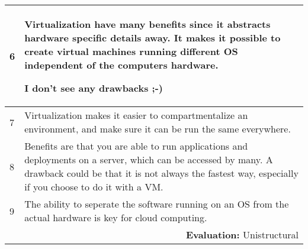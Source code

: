 \begin{longtable}{|p{0.3cm}|p{14.7cm}|}
6 & Virtualization have many benefits since it abstracts hardware specific details away. It makes it possible to create virtual machines running different OS independent of the computers hardware. 

\noindent I don't see any drawbacks ;-) \\ \hline

7 & Virtualization makes it easier to compartmentalize an environment, and make sure it can be run the same everywhere. \\ \hline

8 & Benefits are that you are able to run applications and deployments on a server, which can be accessed by many. A drawback could be that it is not always the fastest way, especially if you choose to do it with a VM. \\ \hline

9 & The ability to seperate the software running on an OS from the actual hardware is key for cloud computing.  \\ \hline


\multicolumn{2}{r}{\textbf{Evaluation:} Unistructural} \\ 
\end{longtable}
\normalsize



